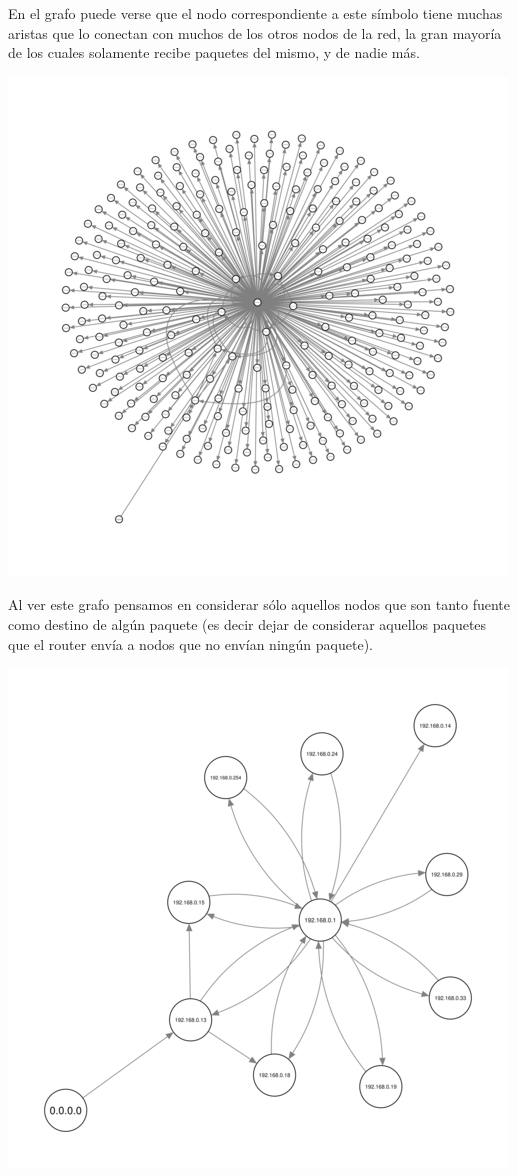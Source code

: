 En el grafo puede verse que el nodo correspondiente a este símbolo
tiene muchas aristas que lo
conectan con muchos de los otros nodos de la red, la gran mayoría de
los cuales solamente recibe paquetes del mismo, y de nadie más.

\begin{center}
\includegraphics[scale=0.6]{../img/eric-lavarropas.png}
\end{center}

Al ver este grafo pensamos en considerar sólo aquellos nodos que son
tanto fuente como destino de algún paquete (es decir dejar
de considerar aquellos paquetes que el router 
envía a nodos que no envían ningún paquete).

\begin{center}
\includegraphics[scale=0.6]{../img/eric-flor.png}
\end{center}

